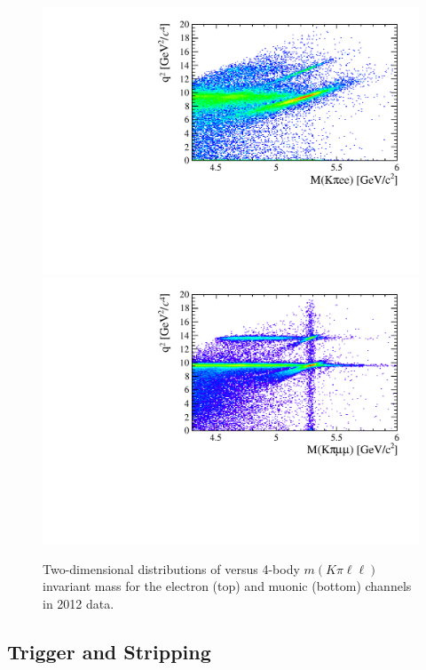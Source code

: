 \begin{figure}[t!]
\centering 
\includegraphics[width=1.\textwidth]{RKst/figs/electron_B0jpsi2D_selected.pdf}
\includegraphics[width=1.\textwidth]{RKst/figs/muon_B0jpsi2D_selected.pdf}
\caption{Two-dimensional distributions of \qsq versus 4-body $m(K\pi\ell\ell)$
invariant mass for the electron (top) and muonic (bottom) channels in 2012 data.}
\label{fig:2D_q2_B0mass}
\end{figure}


\subsection{Trigger and Stripping }
\label{sec:RKst_trigstripping}


